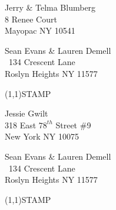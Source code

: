 \documentclass[12pt]{article}
\begin{document}
\begin{center} \begin{Huge} \vspace*{\fill}
Jerry \& Telma Blumberg\\
8 Renee Court\\
Mayopac NY 10541\\
\vspace{\fill} \end{Huge} \end{center}

\clearpage

\begin{minipage}{.5\linewidth} \noindent
Sean Evans \& Lauren Demell\\\ 
134 Crescent Lane\\ 
Roslyn Heights NY 11577
\end{minipage}
\begin{minipage}{.5\linewidth \hspace{-.2in} \vspace{-.3in}}
\begin{flushright}
\framebox(1,1){STAMP}
\end{flushright}
\end{minipage}

\begin{center} \begin{Huge} \vspace*{\fill}
Jessie Gwilt\\
318 East $78^{th}$ Street \#9\\
New York NY 10075\\
\vspace{\fill} \end{Huge} \end{center}

\clearpage

\begin{minipage}{.5\linewidth} \noindent
Sean Evans \& Lauren Demell\\\ 
134 Crescent Lane\\ 
Roslyn Heights NY 11577
\end{minipage}
\begin{minipage}{.5\linewidth \hspace{-.2in} \vspace{-.3in}}
\begin{flushright}
\framebox(1,1){STAMP}
\end{flushright}
\end{minipage}
\end{document}
